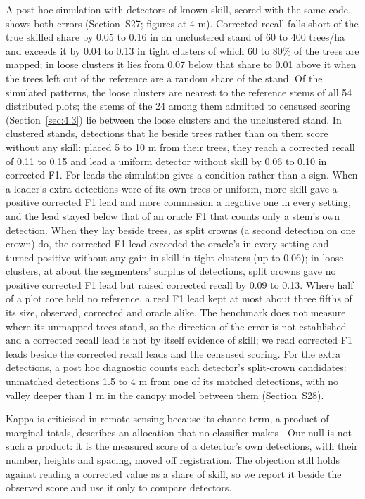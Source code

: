 \documentclass[preprint,12pt,authoryear,a4paper]{elsarticle}
\begin{document}
A post hoc simulation with detectors of known skill, scored with the same code,
shows both errors (Section~S27; figures at 4 m). Corrected recall falls short of
the true skilled share by 0.05 to 0.16 in an unclustered stand of 60 to 400
trees/ha and exceeds it by 0.04 to 0.13 in tight clusters of which 60 to 80\% of
the trees are mapped; in loose clusters it lies from 0.07 below that share to
0.01 above it when the trees left out of the reference are a random share of the
stand. Of the simulated patterns, the loose clusters are nearest to the
reference stems of all 54 distributed plots; the stems of the 24 among them
admitted to censused scoring (Section~\ref{sec:4.3}) lie between the loose clusters and
the unclustered stand. In clustered stands, detections that lie beside trees
rather than on them score without any skill: placed 5 to 10 m from their trees,
they reach a corrected recall of 0.11 to 0.15 and
lead a uniform detector without skill by 0.06 to 0.10 in corrected F1. For
leads the simulation gives a condition rather than a sign. When a leader's
extra detections were of its own trees or uniform, more skill gave a positive
corrected F1 lead and more commission a negative one in every setting, and the
lead stayed below that of an oracle F1 that counts only a stem's own
detection. When they lay beside trees, as split crowns (a second detection on
one crown) do, the corrected F1 lead exceeded the oracle's in every setting
and turned positive without any gain in skill in tight clusters (up to 0.06);
in loose clusters, at about the segmenters' surplus of detections, split
crowns gave no positive corrected F1 lead but raised corrected recall by 0.09
to 0.13. Where half of a plot core held no reference, a real F1 lead kept at
most about three fifths of its size, observed, corrected and oracle alike. The
benchmark does not measure where its unmapped trees stand, so the direction of
the error is not established and a corrected recall lead is not by itself
evidence of skill; we read corrected F1 leads beside the corrected recall leads
and the censused scoring. For the extra detections, a post hoc diagnostic counts
each detector's split-crown candidates: unmatched detections 1.5 to 4 m from one
of its matched detections, with no valley deeper than 1 m in the canopy model
between them (Section~S28).

Kappa is criticised in remote sensing because its chance term, a product of
marginal totals, describes an allocation that no classifier makes
\citep{pontius2011death,foody2020explaining}. Our null is not such a product: it is
the measured score of a detector's own detections, with their number, heights
and spacing, moved off registration. The objection still holds against reading a
corrected value as a share of skill, so we report it beside the observed score
and use it only to compare detectors.
\end{document}
